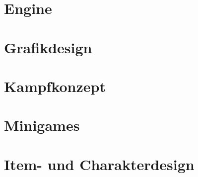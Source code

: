 \section{Engine}


\section{Grafikdesign}


\section{Kampfkonzept}


\section{Minigames}


\section{Item- und Charakterdesign}


